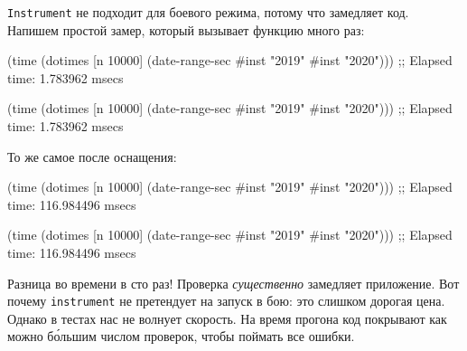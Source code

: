 
\verb|Instrument| не подходит для боевого режима, потому что замедляет
код. Напишем простой замер, который вызывает функцию много раз:


\ifx\DEVICETYPE\MOBILE

\begin{english}
  \begin{clojure}
(time
 (dotimes [n 10000]
   (date-range-sec #inst "2019"
                   #inst "2020")))
;; Elapsed time: 1.783962 msecs
  \end{clojure}
\end{english}

\else

\begin{english}
  \begin{clojure}
(time
 (dotimes [n 10000]
   (date-range-sec #inst "2019" #inst "2020")))
;; Elapsed time: 1.783962 msecs
  \end{clojure}
\end{english}

\fi

\noindent
То же самое после оснащения:

\ifx\DEVICETYPE\MOBILE

\begin{english}
  \begin{clojure}
(time
 (dotimes [n 10000]
   (date-range-sec #inst "2019"
                   #inst "2020")))
;; Elapsed time: 116.984496 msecs
  \end{clojure}
\end{english}

\else

\begin{english}
  \begin{clojure}
(time
 (dotimes [n 10000]
   (date-range-sec #inst "2019" #inst "2020")))
;; Elapsed time: 116.984496 msecs
  \end{clojure}
\end{english}

\fi


Разница во времени в сто раз! Проверка \emph{существенно} замедляет приложение. Вот почему
\verb|instrument| не претендует на запуск в бою: это слишком дорогая
цена. Однако в тестах нас не волнует скорость. На время прогона код покрывают
как можно б\'{о}льшим числом проверок, чтобы поймать все ошибки.

